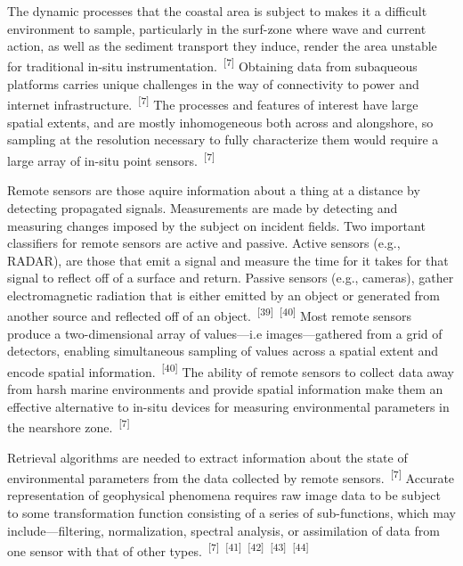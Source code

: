 \documentclass{article}
\begin{document}

\par{The dynamic processes that the coastal area is subject to makes it a difficult environment to sample, particularly in the surf-zone where wave and current action, as well as the sediment transport they induce, render the area unstable for traditional in-situ instrumentation.~\textsuperscript{[7]} Obtaining data from subaqueous platforms carries unique challenges in the way of connectivity to power and internet infrastructure.~\textsuperscript{[7]} The processes and features of interest have large spatial extents, and are mostly inhomogeneous both across and alongshore, so sampling at the resolution necessary to fully characterize them would require a large array of in-situ point sensors.~\textsuperscript{[7]}}


\par{Remote sensors are those aquire information about a thing at a distance by detecting propagated signals. Measurements are made by detecting and measuring changes imposed by the subject on incident fields. Two important classifiers for remote sensors are active and passive. Active sensors (e.g., RADAR), are those that emit a signal and measure the time for it takes for that signal to reflect off of a surface and return. Passive sensors (e.g., cameras), gather electromagnetic radiation that is either emitted by an object or generated from another source and reflected off of an object.~\textsuperscript{[39]}~\textsuperscript{[40]} Most remote sensors produce a two-dimensional array of values---i.e images---gathered from a grid of detectors, enabling simultaneous sampling of values across a spatial extent and encode spatial information.~\textsuperscript{[40]} The ability of remote sensors to collect data away from harsh marine environments and provide spatial information make them an effective alternative to in-situ devices for measuring environmental parameters in the nearshore zone.~\textsuperscript{[7]}}


\par{Retrieval algorithms are needed to extract information about the state of environmental parameters from the data collected by remote sensors.~\textsuperscript{[7]} Accurate representation of geophysical phenomena requires raw image data to be subject to some transformation function consisting of a series of sub-functions, which may include---filtering, normalization, spectral analysis, or assimilation of data from one sensor with that of other types.~\textsuperscript{[7]}~\textsuperscript{[41]}~\textsuperscript{[42]}~\textsuperscript{[43]}~\textsuperscript{[44]}}
\end{document}
